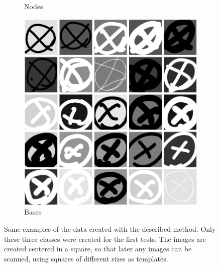 \begin{figure}
\begin{subfigure}[b]{0.3\textwidth}
        \caption{Nodes}
        \label{fig:25_links}
    \end{subfigure}
    \begin{subfigure}[b]{0.3\textwidth}
        \includegraphics[width=\textwidth]{images/25_x.png}
        \caption{Bases}
        \label{fig:25_bases}
    \end{subfigure}
    \caption{Some examples of the data created with the described method. Only these three classes were created for the first tests. The images are created centered in a square, so that later any images can be scanned, using squares of different sizes as templates. }
    \label{fig:generated_data_samples}
\end{figure}
